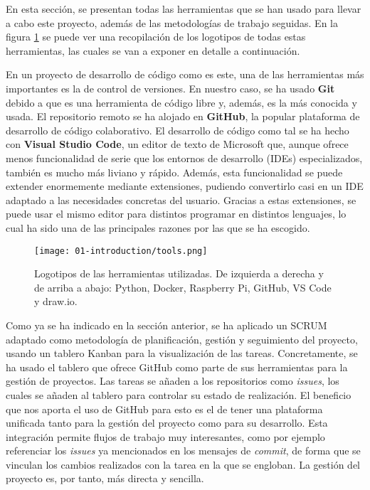 En esta sección, se presentan todas las herramientas que se han usado para
llevar a cabo este proyecto, además de las metodologías de trabajo seguidas. En
la figura \ref{fig:01-tools} se puede ver una recopilación de los logotipos de
todas estas herramientas, las cuales se van a exponer en detalle a continuación.

En un proyecto de desarrollo de código como es este, una de las herramientas más
importantes es la de control de versiones. En nuestro caso, se ha usado
\textbf{Git} debido a que es una herramienta de código libre y, además, es la
más conocida y usada. El repositorio remoto se ha alojado en \textbf{GitHub}, la
popular plataforma de desarrollo de código colaborativo. El desarrollo de código
como tal se ha hecho con \textbf{Visual Studio Code}, un editor de texto de
Microsoft que, aunque ofrece menos funcionalidad de serie que los entornos de
desarrollo (IDEs) especializados, también es mucho más liviano y rápido. Además,
esta funcionalidad se puede extender enormemente mediante extensiones, pudiendo
convertirlo casi en un IDE adaptado a las necesidades concretas del usuario.
Gracias a estas extensiones, se puede usar el mismo editor para distintos
programar en distintos lenguajes, lo cual ha sido una de las principales razones
por las que se ha escogido.

\begin{figure}[H]
      \centering
      \texttt{[image: 01-introduction/tools.png]}
      \caption{Logotipos de las herramientas utilizadas. De izquierda a derecha y%
            de arriba a abajo: Python, Docker, Raspberry Pi, GitHub, VS Code y
            draw.io.}
      \label{fig:01-tools}
\end{figure}

Como ya se ha indicado en la sección anterior, se ha aplicado un SCRUM adaptado
como metodología de planificación, gestión y seguimiento del proyecto, usando un
tablero Kanban para la visualización de las tareas. Concretamente, se ha usado
el tablero que ofrece GitHub como parte de sus herramientas para la gestión de
proyectos. Las tareas se añaden a los repositorios como \textit{issues}, los
cuales se añaden al tablero para controlar su estado de realización. El
beneficio que nos aporta el uso de GitHub para esto es el de tener una
plataforma unificada tanto para la gestión del proyecto como para su desarrollo.
Esta integración permite flujos de trabajo muy interesantes, como por ejemplo
referenciar los \textit{issues} ya mencionados en los mensajes de
\textit{commit}, de forma que se vinculan los cambios realizados con la tarea en
la que se engloban. La gestión del proyecto es, por tanto, más directa y
sencilla.


